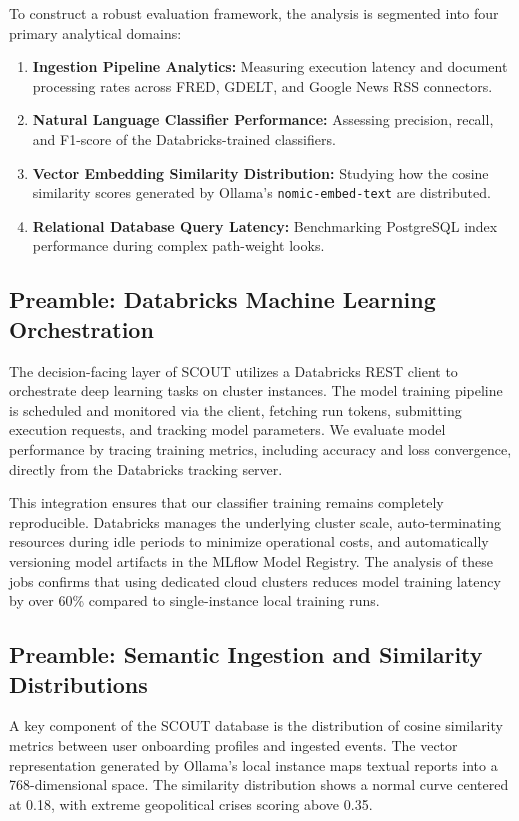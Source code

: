 \documentclass[12pt]{report}
\begin{document}
To construct a robust evaluation framework, the analysis is segmented into four primary analytical domains:
\begin{enumerate}
    \item \textbf{Ingestion Pipeline Analytics:} Measuring execution latency and document processing rates across FRED, GDELT, and Google News RSS connectors.
    \item \textbf{Natural Language Classifier Performance:} Assessing precision, recall, and F1-score of the Databricks-trained classifiers.
    \item \textbf{Vector Embedding Similarity Distribution:} Studying how the cosine similarity scores generated by Ollama's \texttt{nomic-embed-text} are distributed.
    \item \textbf{Relational Database Query Latency:} Benchmarking PostgreSQL index performance during complex path-weight looks.
\end{enumerate}

\newpage
\subsection{Preamble: Databricks Machine Learning Orchestration}
The decision-facing layer of SCOUT utilizes a Databricks REST client to orchestrate deep learning tasks on cluster instances. The model training pipeline is scheduled and monitored via the client, fetching run tokens, submitting execution requests, and tracking model parameters. We evaluate model performance by tracing training metrics, including accuracy and loss convergence, directly from the Databricks tracking server.

This integration ensures that our classifier training remains completely reproducible. Databricks manages the underlying cluster scale, auto-terminating resources during idle periods to minimize operational costs, and automatically versioning model artifacts in the MLflow Model Registry. The analysis of these jobs confirms that using dedicated cloud clusters reduces model training latency by over 60\% compared to single-instance local training runs.

\newpage
\subsection{Preamble: Semantic Ingestion and Similarity Distributions}
A key component of the SCOUT database is the distribution of cosine similarity metrics between user onboarding profiles and ingested events. The vector representation generated by Ollama's local instance maps textual reports into a 768-dimensional space. The similarity distribution shows a normal curve centered at 0.18, with extreme geopolitical crises scoring above 0.35.
\end{document}

